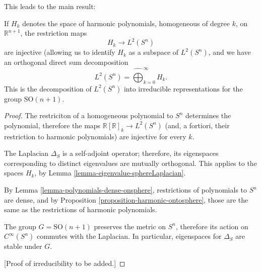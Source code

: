 This leads to the main result:
\begin{theorem}
 \label{theorem-sphericalharmonics}
If $H_k$ denotes the space of harmonic polynomials, homogeneous of degree $k$, on $\mathbb R^{n+1}$, the restriction maps
$$H_k \to L^2(S^n)$$
are injective (allowing us to identify $H_k$ as a subspace of $L^2(S^n)$, and we have an orthogonal direct sum decomposition 
$$ L^2(S^n) = \hat\bigoplus_{k=0}^\infty H_k.$$
This is the decomposition of $L^2(S^n)$ into irreducible representations for the group $\text{SO}(n+1)$.
\end{theorem}

\begin{proof}
 The restriciton of a homogeneous polynomial to $S^n$ determines the polynomial, therefore the maps $\mathbb R[\mathbb R]_k \to L^2(S^n)$ (and, a fortiori, their restriction to harmonic polynomials) are injective for every $k$.
 
 The Laplacian $\Delta_S$ is a self-adjoint operator; therefore, its eigenspaces corresponding to distinct eigenvalues are mutually orthogonal. This applies to the spaces $H_k$, by Lemma \ref{lemma-eigenvalue-sphereLaplacian}.
 
 By Lemma  \ref{lemma-polynomials-dense-onsphere}, restrictions of polynomials to $S^n$ are dense, and by Proposition \ref{proposition-harmonic-ontosphere}, those are the same as the restrictions of harmonic polynomials.
 
 The group $G=\text{SO}(n+1)$ preserves the metric on $S^n$, therefore its action on $C^\infty(S^n)$ commutes with the Laplacian. In particular, eigenspaces for $\Delta_S$ are stable under $G$. 
 
 [Proof of irreducibility to be added.]
\end{proof}












